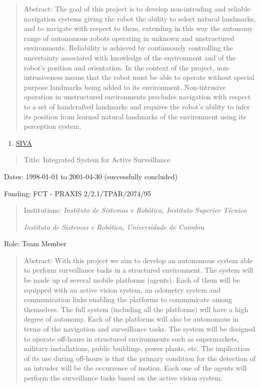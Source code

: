 \begin{quote}
Abstract: The goal of this project is to develop non-intruding and
reliable navigation systems giving the robot the ability to select
natural landmarks, and to navigate with respect to them, extending in
this way the autonomy range of autonomous robots operating in unknown
and unstructured environments. Reliability is achieved by continuously
controlling the uncertainty associated with knowledge of the environment
and of the robot's position and orientation. In the context of the
project, non-intrusiveness means that the robot must be able to operate
without special purpose landmarks being added to its environment.
Non-intrusive operation in unstructured environments precludes
navigation with respect to a set of handcrafted landmarks and requires
the robot's ability to infer its position from learned natural landmarks
of the environment using its perception system.
\end{quote}

\begin{enumerate}
\def\labelenumi{\arabic{enumi}.}
\setcounter{enumi}{20}
\item
  \ul{SIVA}
\end{enumerate}

\begin{quote}
Title: Integrated System for Active Surveillance
\end{quote}

Dates: 1998-01-01 to 2001-04-30 (successfully concluded)

Funding: FCT - PRAXIS 2/2.1/TPAR/2074/95 \hl{}

\begin{quote}
Institutions: \emph{Instituto de Sistemas e Robótica, Instituto Superior
Técnico}

\emph{Instituto de Sistemas e Robótica, Universidade de Coimbra}
\end{quote}

Role: Team Member

\begin{quote}
Abstract: With this project we aim to develop an autonomous system able
to perform surveillance tasks in a structured environment. The system
will be made up of several mobile platforms (agents). Each of them will
be equipped with an active vision system, an odometry system and
communication links enabling the platforms to communicate among
themselves. The full system (including all the platforms) will have a
high degree of autonomy. Each of the platforms will also be autonomous
in terms of the navigation and surveillance tasks. The system will be
designed to operate off-hours in structured environments such as
supermarkets, military installations, public buildings, power plants,
etc. The implication of its use during off-hours is that the primary
condition for the detection of an intruder will be the occurrence of
motion. Each one of the agents will perform the surveillance tasks based
on the active vision system.
\end{quote}

